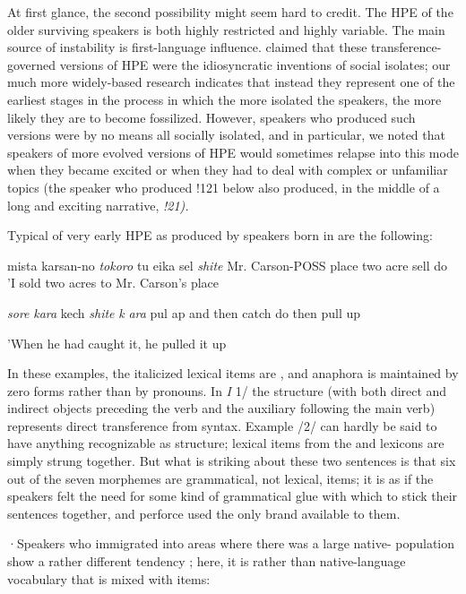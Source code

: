 At first glance, the second possibility might seem hard to credit. The HPE of the older surviving speakers is both highly restricted and highly variable. The main source of instability is first-language influ\-ence. \citet{Labov1971} claimed that these transference-governed versions of HPE were the idiosyncratic inventions of social isolates; our much more widely-based research indicates that instead they represent one of the earliest stages in the  process in which the more isolated the speakers, the more likely they are to become fossilized. However, speakers who produced such versions were by no means all socially isolated, and in particular, we noted that speakers of more evolved versions of HPE would sometimes relapse into this mode when they became excited or when they had to deal with complex or un\-familiar topics (the speaker who produced !121 below also produced, in the middle of a long and exciting narrative, \textit{!21).}

Typical of very early HPE as produced by speakers born in  are the following:

\ea\label{ex:1}
 mista karsan-no \textit{to}\textit{k}\textit{oro} tu eika sel \textit{shite} Mr. Carson-POSS place two acre sell do 'I sold two acres to Mr. Carson's place
\glt
\z

\ea\label{ex:2}
 \textit{sore} \textit{kara} kech \textit{shite} \textit{k} \textit{ara} pul ap and then catch do then pull up
\glt
\z

'When he had caught it, he pulled it up


In these examples, the italicized lexical items are , and ana\-phora is maintained by zero forms rather than by pronouns. In \textit{I} 1/ the structure (with both direct and indirect objects preceding the verb and the auxiliary following the main verb) represents direct transference from  syntax. Example /2/ can hardly be said to have anything recognizable as structure; lexical items from the  and  lexicons are simply strung together. But what is striking about these two sentences is that six out of the seven  morphemes are grammatical, not lexical, items; it is as if the speakers felt the need for some kind of grammatical glue with which to stick their sentences together, and perforce used the only brand available to them.

·Speakers who immigrated into areas where there was a large native- population show a rather different tendency ; here, it is  rather than native-language vocabulary that is mixed with  items:

